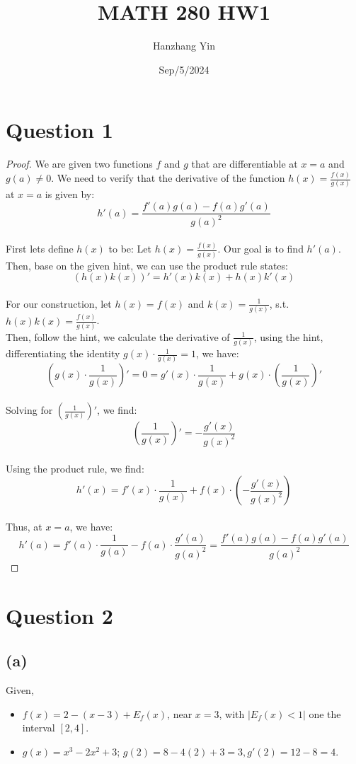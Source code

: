 \documentclass{article}
\title{MATH 280 HW1}
\author{Hanzhang Yin}
\date{Sep/5/2024}
\begin{document}
\maketitle

\section*{Question 1}

\begin{proof}
    We are given two functions \( f \) and \( g \) that are differentiable at \( x = a \) and \( g(a) \neq 0 \). We need to verify that the derivative of the function \( h(x) = \frac{f(x)}{g(x)} \) at \( x = a \) is given by:
    \[ h'(a) = \frac{f'(a)g(a) - f(a)g'(a)}{g(a)^2} \]
    \\
    First lets define $h(x)$ to be:
    Let \( h(x) = \frac{f(x)}{g(x)} \). Our goal is to find \( h'(a) \).
    \\
    Then, base on the given hint, we can use the product rule states:
    \[ (h(x)k(x))' = h'(x)k(x) + h(x)k'(x) \]
    \\
    For our construction, let \( h(x) = f(x) \) and \( k(x) = \frac{1}{g(x)} \), s.t. \( h(x)k(x) = \frac{f(x)}{g(x)} \).
    \\
    Then, follow the hint, we calculate the derivative of $\frac{1}{g(x)}$, using the hint, differentiating the identity \( g(x) \cdot \frac{1}{g(x)} = 1 \), we have:
    \[ (g(x) \cdot \frac{1}{g(x)})' = 0 = g'(x) \cdot \frac{1}{g(x)} + g(x) \cdot (\frac{1}{g(x)})' \]
    \\
    Solving for \( (\frac{1}{g(x)})' \), we find:
    \[ (\frac{1}{g(x)})' = -\frac{g'(x)}{g(x)^2} \]
    \\
    Using the product rule, we find:
    \[ h'(x) = f'(x) \cdot \frac{1}{g(x)} + f(x) \cdot \left(-\frac{g'(x)}{g(x)^2}\right) \]
    \\
    Thus, at \( x = a \), we have:
    \[ h'(a) = f'(a) \cdot \frac{1}{g(a)} - f(a) \cdot \frac{g'(a)}{g(a)^2} = \frac{f'(a)g(a) - f(a)g'(a)}{g(a)^2} \]

\end{proof}

\section*{Question 2}

\subsection*{(a)}
Given,
\begin{itemize}
    \item $f(x) = 2 - (x - 3) + E_f(x)$, near $x = 3$, with $|E_f(x) < 1|$ one the interval $[2,4]$.
    \item $g(x) = x^3 - 2x^2 + 3$; $g(2) = 8 - 4(2) + 3 = 3, g'(2) = 12 - 8 = 4$.
\end{itemize}
\end{document}
